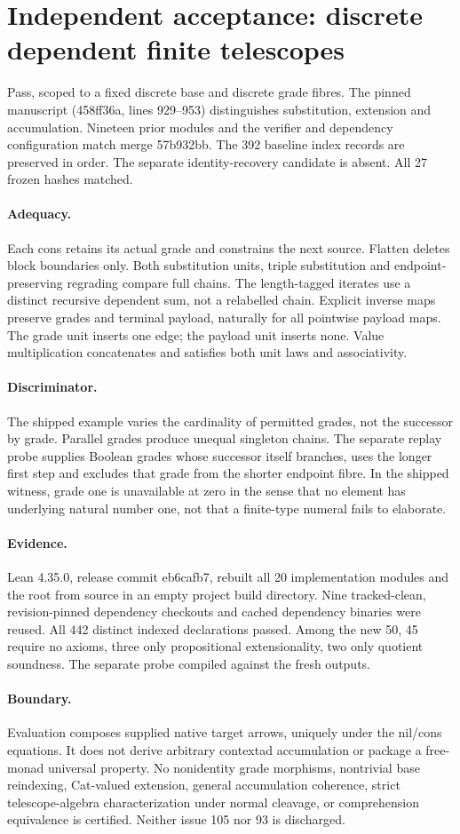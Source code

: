 \documentclass{article}
\begin{document}
\section*{Independent acceptance: discrete dependent finite telescopes}
Pass, scoped to a fixed discrete base and discrete grade fibres. The pinned manuscript (458ff36a, lines 929--953) distinguishes substitution, extension and accumulation. Nineteen prior modules and the verifier and dependency configuration match merge 57b932bb. The 392 baseline index records are preserved in order. The separate identity-recovery candidate is absent. All 27 frozen hashes matched.
\paragraph{Adequacy.} Each cons retains its actual grade and constrains the next source. Flatten deletes block boundaries only. Both substitution units, triple substitution and endpoint-preserving regrading compare full chains. The length-tagged iterates use a distinct recursive dependent sum, not a relabelled chain. Explicit inverse maps preserve grades and terminal payload, naturally for all pointwise payload maps. The grade unit inserts one edge; the payload unit inserts none. Value multiplication concatenates and satisfies both unit laws and associativity.
\paragraph{Discriminator.} The shipped example varies the cardinality of permitted grades, not the successor by grade. Parallel grades produce unequal singleton chains. The separate replay probe supplies Boolean grades whose successor itself branches, uses the longer first step and excludes that grade from the shorter endpoint fibre. In the shipped witness, grade one is unavailable at zero in the sense that no element has underlying natural number one, not that a finite-type numeral fails to elaborate.
\paragraph{Evidence.} Lean 4.35.0, release commit eb6cafb7, rebuilt all 20 implementation modules and the root from source in an empty project build directory. Nine tracked-clean, revision-pinned dependency checkouts and cached dependency binaries were reused. All 442 distinct indexed declarations passed. Among the new 50, 45 require no axioms, three only propositional extensionality, two only quotient soundness. The separate probe compiled against the fresh outputs.
\paragraph{Boundary.} Evaluation composes supplied native target arrows, uniquely under the nil/cons equations. It does not derive arbitrary contextad accumulation or package a free-monad universal property. No nonidentity grade morphisms, nontrivial base reindexing, Cat-valued extension, general accumulation coherence, strict telescope-algebra characterization under normal cleavage, or comprehension equivalence is certified. Neither issue 105 nor 93 is discharged.
\end{document}
